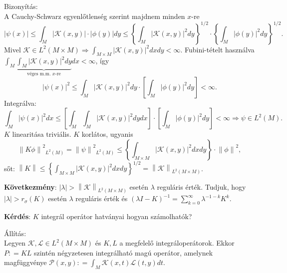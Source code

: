 \documentclass[12pt,a4paper]{scrartcl}
\newenvironment{bizonyitas}{}{}
\newenvironment{allitas}{}{}
\begin{document}
\begin{bizonyitas}

Bizonyítás:\\
A Cauchy-Schwarz egyenlőtlenség szerint majdnem minden \(x\)-re
\[\left| {\psi\left( x \right)} \right| \leq {\int_{M}{\left| {\mathcal{K}\left( {x,y} \right)} \right| \cdot \left| {\phi\left( y \right)} \right|dy \leq \left\{ {\int_{M}{\left| {\mathcal{K}\left( {x,y} \right)} \right|^{2}dy}} \right\}^{1/2} \cdot \left\{ {\int_{M}{\left| {\phi\left( y \right)} \right|^{2}dy}} \right\}^{1/2}}}.\]
Mivel
\(\left. \mathcal{K} \in L^{2}\left( {M \times M} \right)\Rightarrow{\int_{M \times M}{\left| {\mathcal{K}\left( {x,y} \right)} \right|^{2}dxdy < \infty}} \right.\).
Fubini-tételt használva
\(\int_M {\underbrace {\int_M {{{\left| {\mathcal{K}\left( {x,y} \right)} \right|}^2}dy} }_{{\text{véges m.m. }}x{\text{-re}}} dx} < \infty\),
így
\[\left| {\psi\left( x \right)} \right|^{2} \leq {\int_{M}{\left| {\mathcal{K}\left( {x,y} \right)} \right|^{2}dy}} \cdot \left\lbrack {\int_{M}{\left| {\phi\left( y \right)} \right|^{2}dy}} \right\rbrack < \infty.\]Integrálva:
\[\left. {\int_{M}{\left| {\psi\left( x \right)} \right|^{2}dx}} \leq \left\lbrack {\int_{M}{{\int_{M}{\left| {\mathcal{K}\left( {x,y} \right)} \right|^{2}dy}}dx}} \right\rbrack \cdot \left\lbrack {\int_{M}{\left| {\phi\left( y \right)} \right|^{2}dy}} \right\rbrack < \infty\Rightarrow\psi \in L^{2}\left( M \right). \right.\]\(K\)
linearitása triviális. \(K\) korlátos, ugyanis
\[\left\| {K\phi} \right\|^{2}{}_{L^{2}{(M)}} = \left\| \psi \right\|^{2}{}_{L^{2}{(M)}} \leq \left\{ {\int_{M \times M}{\left| {\mathcal{K}\left( {x,y} \right)} \right|^{2}dxdy}} \right\} \cdot \left\| \phi \right\|^{2},\]
sőt:
\(\left\| K \right\| \leq \left\{ {\int_{M \times M}{\left| {\mathcal{K}\left( {x,y} \right)} \right|^{2}dxdy}} \right\}^{1/2} = \left\| \mathcal{K} \right\|_{L^{2}{({M \times M})}}\).

\end{bizonyitas}

\textbf{Következmény}:
\(\left| \lambda \right| > \left\| \mathcal{K} \right\|_{L^{2}{({M \times M})}}\)
esetén \(\lambda\) reguláris érték. Tudjuk, hogy
\(\left| \lambda \right| > r_{\sigma}\left( K \right)\) esetén
\(\lambda\) reguláris érték és
\(\left( {\lambda I - K} \right)^{- 1} = {\sum\limits_{k = 0}^{\infty}{\lambda^{- 1 - k}K^{k}}}\).

\textbf{Kérdés}: \(K\) integrál operátor hatványai hogyan számolhatók?

\begin{allitas}

Állítás:\\
Legyen \(\mathcal{K},\mathcal{L} \in L^{2}\left( {M \times M} \right)\)
és \(K,L\) a megfelelő integráloperátorok. Ekkor \(P: = KL\) szintén
négyzetesen integrálható magú operátor, amelynek magfüggvénye
\(\mathcal{P}\left( {x,y} \right): = {\int_{M}{\mathcal{K}\left( {x,t} \right)\mathcal{L}\left( {t,y} \right)dt}}\).

\end{allitas}
\end{document}
